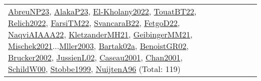 {\begin{longtable}{p{3cm}r>{\raggedright\arraybackslash}p{6cm}>{\raggedright\arraybackslash}p{6cm}>{\raggedright\arraybackslash}p{8cm}}
\hyperref[detail:AbreuNP23]{AbreuNP23}, \hyperref[detail:AlakaP23]{AlakaP23}, \hyperref[detail:El-Kholany2022]{El-Kholany2022}, \hyperref[detail:TouatBT22]{TouatBT22}, \hyperref[detail:Relich2022]{Relich2022}, \hyperref[detail:FarsiTM22]{FarsiTM22}, \hyperref[detail:SvancaraB22]{SvancaraB22}, \hyperref[detail:FetgoD22]{FetgoD22}, \hyperref[detail:NaqviAIAAA22]{NaqviAIAAA22}, \hyperref[detail:KletzanderMH21]{KletzanderMH21}, \hyperref[detail:GeibingerMM21]{GeibingerMM21}, \hyperref[detail:Mischek2021]{Mischek2021}...\hyperref[detail:Mller2003]{Mller2003}, \hyperref[detail:Bartak02a]{Bartak02a}, \hyperref[detail:BenoistGR02]{BenoistGR02}, \hyperref[detail:Brucker2002]{Brucker2002}, \hyperref[detail:JussienL02]{JussienL02}, \hyperref[detail:Caseau2001]{Caseau2001}, \hyperref[detail:Chan2001]{Chan2001}, \hyperref[detail:SchildW00]{SchildW00}, \hyperref[detail:Stobbe1999]{Stobbe1999}, \hyperref[detail:NuijtenA96]{NuijtenA96} (Total: 119)\\
\end{longtable}
}

